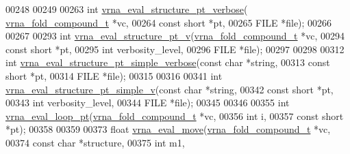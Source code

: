 \begin{DoxyCode}
00248 
00249 
00263 \textcolor{keywordtype}{int} \hyperlink{group__eval_ga8a517cfeeae8c376ae7b1e0c401d38b4}{vrna\_eval\_structure\_pt\_verbose}(
      \hyperlink{group__fold__compound_structvrna__fc__s}{vrna\_fold\_compound\_t} *vc,
00264                                    \textcolor{keyword}{const} \textcolor{keywordtype}{short}          *pt,
00265                                    FILE                 *file);
00266 
00267 
00293 \textcolor{keywordtype}{int} \hyperlink{group__eval_ga2c6533ba0afe4c88d335d8f1e0e2a48e}{vrna\_eval\_structure\_pt\_v}(\hyperlink{group__fold__compound_structvrna__fc__s}{vrna\_fold\_compound\_t} *vc,
00294                              \textcolor{keyword}{const} \textcolor{keywordtype}{short}          *pt,
00295                              \textcolor{keywordtype}{int}                  verbosity\_level,
00296                              FILE                 *file);
00297 
00298 
00312 \textcolor{keywordtype}{int} \hyperlink{group__eval_ga76e152ee9a02be23da14cdddf52b4e44}{vrna\_eval\_structure\_pt\_simple\_verbose}(\textcolor{keyword}{const} \textcolor{keywordtype}{char}  *\textcolor{keywordtype}{string},
00313                                           \textcolor{keyword}{const} \textcolor{keywordtype}{short} *pt,
00314                                           FILE        *file);
00315 
00316 
00341 \textcolor{keywordtype}{int} \hyperlink{group__eval_gac40b813d35289da9816d0c1eec94faa5}{vrna\_eval\_structure\_pt\_simple\_v}(\textcolor{keyword}{const} \textcolor{keywordtype}{char}  *\textcolor{keywordtype}{string},
00342                                     \textcolor{keyword}{const} \textcolor{keywordtype}{short} *pt,
00343                                     \textcolor{keywordtype}{int}         verbosity\_level,
00344                                     FILE        *file);
00345 
00346 
00355 \textcolor{keywordtype}{int} \hyperlink{group__eval_ga730ba4df55c02fd530a0cddd49faf760}{vrna\_eval\_loop\_pt}(\hyperlink{group__fold__compound_structvrna__fc__s}{vrna\_fold\_compound\_t}  *vc,
00356                       \textcolor{keywordtype}{int}                   i,
00357                       \textcolor{keyword}{const} \textcolor{keywordtype}{short}           *pt);
00358 
00359 
00373 \textcolor{keywordtype}{float} \hyperlink{group__eval_gaff1b9e4f4d17b434b0a822fe783672c1}{vrna\_eval\_move}(\hyperlink{group__fold__compound_structvrna__fc__s}{vrna\_fold\_compound\_t} *vc,
00374                      \textcolor{keyword}{const} \textcolor{keywordtype}{char}           *structure,
00375                      \textcolor{keywordtype}{int}                  m1,

\end{DoxyCode}
